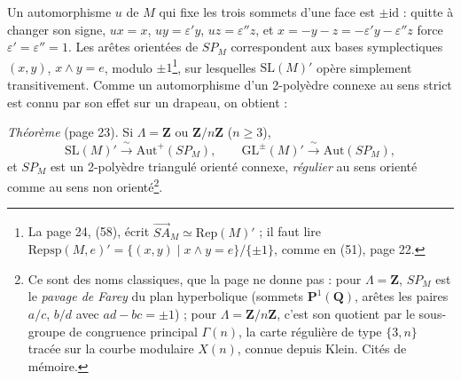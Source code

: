 \documentclass[11pt,a4paper]{article}
\begin{document}
Un automorphisme $u$ de $M$ qui fixe les trois sommets d'une face est $\pm
\mathrm{id}$ : quitte à changer son signe, $ux = x$, $uy = \varepsilon' y$, $uz
= \varepsilon'' z$, et $x = -y - z = -\varepsilon' y - \varepsilon'' z$ force
$\varepsilon' = \varepsilon'' = 1$. Les arêtes orientées de $SP_M$
correspondent aux bases symplectiques $(x, y)$, $x \wedge y = e$, modulo $\pm
1$\footnote{La page 24, (58), écrit $\overrightarrow{SA}_M \simeq
\mathrm{Rep}(M)'$ ; il faut lire $\mathrm{Repsp}(M, e)' = \{(x, y) \mid x
\wedge y = e\}/\{\pm 1\}$, comme en (51), page 22.}, sur lesquelles
$\mathrm{SL}(M)'$ opère simplement transitivement. Comme un automorphisme d'un
2-polyèdre connexe au sens strict est connu par son effet sur un drapeau, on
obtient :

\emph{Théorème} (page 23). Si $\Lambda = \mathbf{Z}$ ou
$\mathbf{Z}/n\mathbf{Z}$ ($n \geq 3$),
\[
  \mathrm{SL}(M)' \xrightarrow{\ \sim\ } \mathrm{Aut}^{+}(SP_M), \qquad
  \mathrm{GL}^{\pm}(M)' \xrightarrow{\ \sim\ } \mathrm{Aut}(SP_M),
\]
et $SP_M$ est un 2-polyèdre triangulé orienté connexe, \emph{régulier} au sens
orienté comme au sens non orienté\footnote{Ce sont des noms classiques, que la
page ne donne pas : pour $\Lambda = \mathbf{Z}$, $SP_M$ est le \emph{pavage de
Farey} du plan hyperbolique (sommets $\mathbf{P}^1(\mathbf{Q})$, arêtes les
paires $a/c$, $b/d$ avec $ad - bc = \pm 1$) ; pour $\Lambda =
\mathbf{Z}/n\mathbf{Z}$, c'est son quotient par le sous-groupe de congruence
principal $\Gamma(n)$, la carte régulière de type $\{3, n\}$ tracée sur la
courbe modulaire $X(n)$, connue depuis Klein. Cités de mémoire.}.
\end{document}

